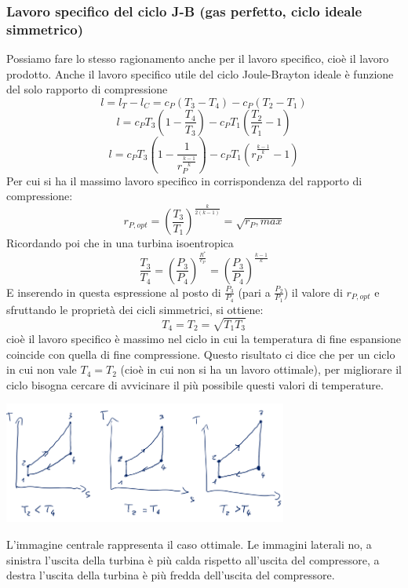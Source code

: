 \subsubsection{Lavoro specifico del ciclo J-B (gas perfetto, ciclo ideale simmetrico)}
Possiamo fare lo stesso ragionamento anche per il lavoro specifico, cioè il lavoro prodotto.\newline
Anche il lavoro specifico utile del ciclo Joule-Brayton ideale è funzione del solo rapporto di compressione
\[
    l = l_T-l_C = c_P (T_3-T_4) - c_P(T_2-T_1)
\]
\[
    l = c_P T_3 \left(1- \frac{T_4}{T_3}\right) - c_P T_1 \left(\frac{T_2}{T_1} - 1\right)
\]
\[
    l = c_P T_3 \left(1- \frac{1}{r_P^{\frac{k-1}{k}}}\right) - c_P T_1 \left(r_P^{\frac{k-1}{k}}-1\right)
\]
Per cui si ha il massimo lavoro specifico in corrispondenza del rapporto di compressione:
\[
    r_{P,opt} = \left(\frac{T_3}{T_1}\right)^{\frac{k}{2(k-1)}} = \sqrt{r_P,max}
\]
Ricordando poi che in una turbina isoentropica
\[
    \frac{T_3}{T_4} = \left(\frac{P_3}{P_4}\right)^{\frac{R^*}{c_P}} = \left(\frac{P_3}{P_4}\right)^\frac{k-1}{k}
\]
E inserendo in questa espressione al posto di $\frac{P_3}{P_4}$ (pari a $\frac{P_2}{P_1}$) il valore di $r_{P,opt}$ e sfruttando le proprietà dei cicli simmetrici, si ottiene:
\[
    T_4 = T_2 = \sqrt{T_1 T_3}
\]
cioè il lavoro specifico è massimo nel ciclo in cui la temperatura di fine espansione coincide con quella di fine compressione.\newline
\newline
Questo risultato ci dice che per un ciclo in cui non vale $T_4 = T_2$ (cioè in cui non si ha un lavoro ottimale), per migliorare il ciclo bisogna cercare di avvicinare il più possibile questi valori di temperature.
\begin{center}
    \includegraphics[height=4cm]{../L07/img7.PNG}
\end{center}
L'immagine centrale rappresenta il caso ottimale. Le immagini laterali no, a sinistra l'uscita della turbina è più calda rispetto all'uscita del compressore, a destra l'uscita della turbina è più fredda dell'uscita del compressore.
